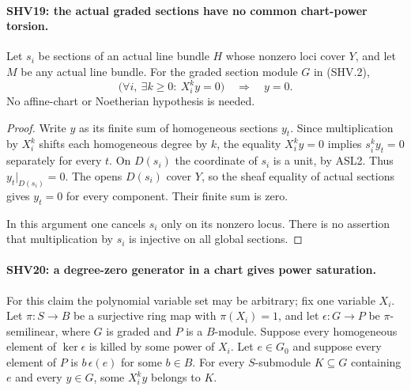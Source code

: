 \paragraph{SHV19: the actual graded sections have no common chart-power torsion.}
\label{claim:SHV19}
Let $s_i$ be sections of an actual line bundle $H$ whose
nonzero loci cover $Y$, and let $M$ be any actual line bundle.
For the graded section module $G$ in (SHV.2),
\[
       \bigl(\forall i,\ \exists k\ge0:\ X_i^k y=0\bigr)
                    \quad\Longrightarrow\quad y=0 .
                                                        \tag{SHV.29}
\]
No affine-chart or Noetherian hypothesis is needed.

\begin{proof}
Write $y$ as its finite sum of homogeneous sections $y_t$.
Since multiplication by $X_i^k$ shifts each homogeneous
degree by $k$, the equality $X_i^k y=0$ implies
$s_i^k y_t=0$ separately for every $t$.  On $D(s_i)$
the coordinate of $s_i$ is a unit, by ASL2.  Thus
$y_t|_{D(s_i)}=0$.  The opens $D(s_i)$ cover $Y$,
so the sheaf equality of actual sections gives $y_t=0$
for every component.  Their finite sum is zero.

In this argument one cancels $s_i$ only on its nonzero
locus.  There is no assertion that multiplication by $s_i$
is injective on all global sections.
\end{proof}

\paragraph{SHV20: a degree-zero generator in a chart gives power saturation.}
\label{claim:SHV20}
For this claim the polynomial variable set may be arbitrary;
fix one variable $X_i$.
Let $\pi:S\to B$ be a surjective ring map with $\pi(X_i)=1$,
and let $\epsilon:G\to P$ be $\pi$-semilinear, where $G$ is
graded and $P$ is a $B$-module.  Suppose every homogeneous
element of $\ker\epsilon$ is killed by some power of $X_i$.
Let $e\in G_0$ and suppose every element of $P$ is
$b\,\epsilon(e)$ for some $b\in B$.  For every $S$-submodule
$K\subseteq G$ containing $e$ and every $y\in G$, some
$X_i^k y$ belongs to $K$.

